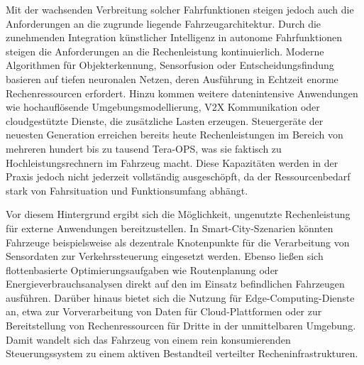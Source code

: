 Mit der wachsenden Verbreitung solcher Fahrfunktionen steigen jedoch auch die Anforderungen an die zugrunde liegende Fahrzeugarchitektur. Durch die zunehmenden Integration künstlicher Intelligenz in autonome Fahrfunktionen steigen die Anforderungen an die Rechenleistung kontinuierlich. Moderne Algorithmen für Objekterkennung, Sensorfusion oder Entscheidungsfindung basieren auf tiefen neuronalen Netzen, deren Ausführung in Echtzeit enorme Rechenressourcen erfordert. Hinzu kommen weitere datenintensive Anwendungen wie hochauflösende Umgebungsmodellierung, V2X Kommunikation oder cloudgestützte Dienste, die zusätzliche Lasten erzeugen. Steuergeräte der neuesten Generation erreichen bereits heute Rechenleistungen im Bereich von mehreren hundert bis zu tausend Tera-OPS, was sie faktisch zu Hochleistungsrechnern im Fahrzeug macht. Diese Kapazitäten werden in der Praxis jedoch nicht jederzeit vollständig ausgeschöpft, da der Ressourcenbedarf stark von Fahrsituation und Funktionsumfang abhängt.

Vor diesem Hintergrund ergibt sich die Möglichkeit, ungenutzte Rechenleistung für externe Anwendungen bereitzustellen. In Smart-City-Szenarien könnten Fahrzeuge beispielsweise als dezentrale Knotenpunkte für die Verarbeitung von Sensordaten zur Verkehrssteuerung eingesetzt werden. Ebenso ließen sich flottenbasierte Optimierungsaufgaben wie Routenplanung oder Energieverbrauchsanalysen direkt auf den im Einsatz befindlichen Fahrzeugen ausführen. Darüber hinaus bietet sich die Nutzung für Edge-Computing-Dienste an, etwa zur Vorverarbeitung von Daten für Cloud-Plattformen oder zur Bereitstellung von Rechenressourcen für Dritte in der unmittelbaren Umgebung. Damit wandelt sich das Fahrzeug von einem rein konsumierenden Steuerungssystem zu einem aktiven Bestandteil verteilter Recheninfrastrukturen.

